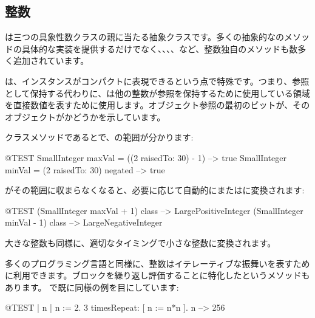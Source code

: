 \documentclass[a4paper,10pt,twoside]{book}
\begin{document}

\subsection{整数}

は三つの具象性数クラスの親に当たる抽象クラスです。多くの抽象的なのメソッドの具体的な実装を提供するだけでなく、、、、など、整数独自のメソッドも数多く追加されています。

は、インスタンスがコンパクトに表現できるという点で特殊です。つまり、参照として保持する代わりに、は他の整数が参照を保持するために使用している領域を直接数値を表すために使用します。オブジェクト参照の最初のビットが、そのオブジェクトがかどうかを示しています。

クラスメソッドであるとで、の範囲が分かります:

\begin{code}{@TEST}
SmallInteger maxVal = ((2 raisedTo: 30) - 1)      --> true
SmallInteger minVal = (2 raisedTo: 30) negated --> true
\end{code}

がその範囲に収まらなくなると、必要に応じて自動的にまたはに変換されます:

\begin{code}{@TEST}
(SmallInteger maxVal + 1) class --> LargePositiveInteger
(SmallInteger minVal - 1) class  --> LargeNegativeInteger
\end{code}

大きな整数も同様に、適切なタイミングで小さな整数に変換されます。

多くのプログラミング言語と同様に、整数はイテレーティブな振舞いを表すために利用できます。ブロックを繰り返し評価することに特化したというメソッドもあります。
で既に同様の例を目にしています:
\begin{code}{@TEST | n |}
n := 2.
3 timesRepeat: [ n := n*n ].
n --> 256
\end{code}
\end{document}
